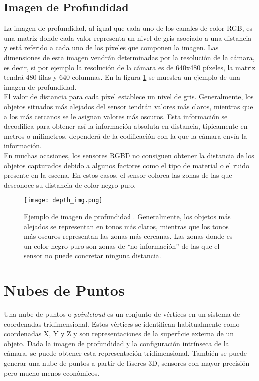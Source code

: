 \subsection{Imagen de Profundidad}

La imagen de profundidad, al igual que cada uno de los canales de color RGB, es una matriz donde cada valor representa un nivel de gris asociado a una distancia y está referido a cada uno de los píxeles que componen la imagen. Las dimensiones de esta imagen vendrán determinadas por la resolución de la cámara, es decir, si por ejemplo la resolución de la cámara es de 640x480 píxeles, la matriz tendrá 480 filas y 640 columnas. En la figura \ref{fig:depth} se muestra un ejemplo de una imagen de profundidad. \\

El valor de distancia para cada píxel establece un nivel de gris. Generalmente, los objetos situados más alejados del sensor tendrán valores más claros, mientras que a los más cercanos se le asignan valores más oscuros. Esta información se decodifica para obtener así la información absoluta en distancia, típicamente en metros o milímetros, dependerá de la codificación con la que la cámara envía la información.\\

En muchas ocasiones, los sensores RGBD no consiguen obtener la distancia de los objetos capturados debido a algunos factores como el tipo de material o el ruido presente en la escena. En estos casos, el sensor colorea las zonas de las que desconoce su distancia de color negro puro.\\

\begin{figure}[H]
	\begin{center} 
		\texttt{[image: depth\_img.png]}
	\end{center}
	\caption{Ejemplo de imagen de profundidad \cite{depthimage}. Generalmente, los objetos más alejados se representan en tonos más claros, mientras que los tonos más oscuros representan las zonas más cercanas. Las zonas donde es un color negro puro son zonas de ``no información'' de las que el sensor no puede concretar ninguna distancia.}
	\label{fig:depth}
\end{figure}

\section{Nubes de Puntos}

Una nube de puntos o \textit{pointcloud} es un conjunto de vértices en un sistema de coordenadas tridimensional. Estos vértices se identifican habitualmente como coordenadas X, Y y Z y son representaciones de la superficie externa de un objeto. Dada la imagen de profundidad y la configuración intrínseca de la cámara, se puede obtener esta representación tridimensional. También se puede generar una nube de puntos a partir de láseres 3D, sensores con mayor precisión pero mucho menos económicos.\\

